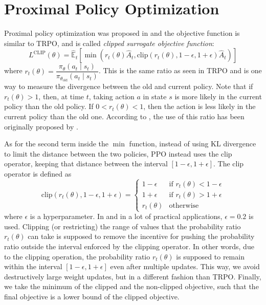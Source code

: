 \section{Proximal Policy Optimization}\label{sec:ppo}
Proximal policy optimization was proposed in \cite{schulman2017proximal} and the objective function is similar to TRPO, and is called \textit{clipped surrogate objective function}:
\begin{equation}
    L^\text{CLIP}(\theta) = \hat{\mathbb{E}}_t\left[\min{\left(r_t(\theta)\hat{A}_t, \text{clip}\left(r_t(\theta), 1- \epsilon, 1+\epsilon\right)\hat{A}_t\right)}\right]
\end{equation}
where $r_t(\theta) = \dfrac{\pi_{\theta}(a_t \mid s_t)}{\pi_{\theta_\text{old}}(a_t \mid s_t)}$. This is the same ratio as seen in TRPO and is one way to measure the divergence between the old and current policy. Note that if $r_t(\theta) > 1$, then, at time $t$, taking action $a$ in state $s$ is more likely in the current policy than the old policy. If $0 < r_t(\theta) < 1$, then the action is less likely in the current policy than the old one. According to \cite{schulman2017proximal}, the use of this ratio has been originally proposed by \cite{Kakade02approximatelyoptimal}. 

As for the second term inside the $\min$ function, instead of using KL divergence to limit the distance between the two policies, PPO instead uses the clip operator, keeping that distance between the interval $[1-\epsilon, 1+\epsilon]$. The clip operator is defined as
\begin{equation}
    \text{clip}\left(r_t(\theta), 1- \epsilon, 1+\epsilon\right)=
        \begin{cases}
            1 - \epsilon & \text{if } r_t(\theta) < 1-\epsilon\\
            1 + \epsilon & \text{if } r_t(\theta) > 1+\epsilon\\
            r_t(\theta) & \text{otherwise}
        \end{cases}
    \end{equation}
where $\epsilon$ is a hyperparameter. In \cite{schulman2017proximal} and in a lot of practical applications, $\epsilon = 0.2$ is used. Clipping (or restricting) the range of values that the probability ratio $r_t(\theta)$ can take is supposed to remove the incentive for pushing the probability ratio outside the interval enforced by the clipping operator. In other words, due to the clipping operation, the probability ratio $r_t(\theta)$ is supposed to remain within the interval $[1-\epsilon, 1+\epsilon]$ even after multiple updates. This way, we avoid destructively large weight updates, but in a different fashion than TRPO. Finally, we take the minimum of the clipped and the non-clipped objective, such that the final objective is a lower bound of the clipped objective.


